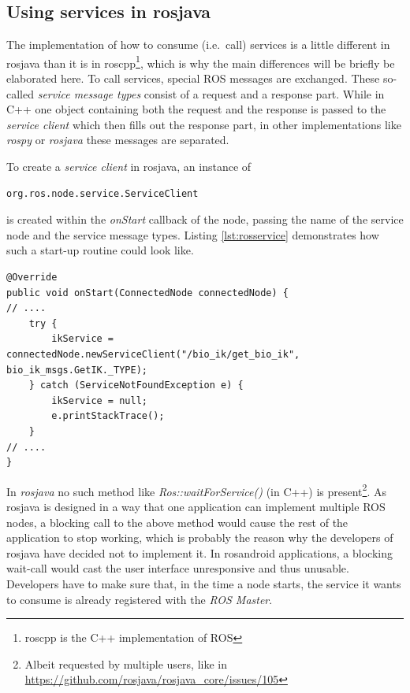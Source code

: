 \subsection{Using services in rosjava}
\label{sec:using_services}
The implementation of how to consume (i.e.~call) services is a little different in rosjava than it is in roscpp\footnote{roscpp is the C++ implementation of ROS}, which is why the main differences will be briefly be elaborated here. To call services, special ROS messages are exchanged. These so-called \textit{service message types} consist of a request and a response part. While in C++ one object containing both the request and the response is passed to the \textit{service client} which then fills out the response part\cite{ros:serviceclient}, in other implementations like \textit{rospy} or \textit{rosjava} these messages are separated.

To create a \textit{service client} in rosjava, an instance of 

\begin{lstlisting}[numbers=none]
org.ros.node.service.ServiceClient
\end{lstlisting}

is created within the \textit{onStart} callback of the node, passing the name of the service node and the service message types. Listing \ref{lst:rosservice} demonstrates how such a start-up routine could look like.

\begin{lstlisting}[caption={Example on how to connect to a ROS service in rosjava},label=lst:rosservice]
@Override
public void onStart(ConnectedNode connectedNode) {
// ....
	try {
		ikService = connectedNode.newServiceClient("/bio_ik/get_bio_ik", bio_ik_msgs.GetIK._TYPE);
	} catch (ServiceNotFoundException e) {
		ikService = null;
		e.printStackTrace();
	}	
// ....
}
\end{lstlisting}

In \textit{rosjava} no such method like \textit{Ros::waitForService()} (in C++) is present\footnote{Albeit requested by multiple users, like in \url{https://github.com/rosjava/rosjava_core/issues/105}}. As rosjava is designed in a way that one application can implement multiple ROS nodes, a blocking call to the above method would cause the rest of the application to stop working, which is probably the reason why the developers of rosjava have decided not to implement it. In rosandroid applications, a blocking wait-call would cast the user interface unresponsive and thus unusable. Developers have to make sure that, in the time a node starts, the service it wants to consume is already registered with the \textit{ROS Master}.


